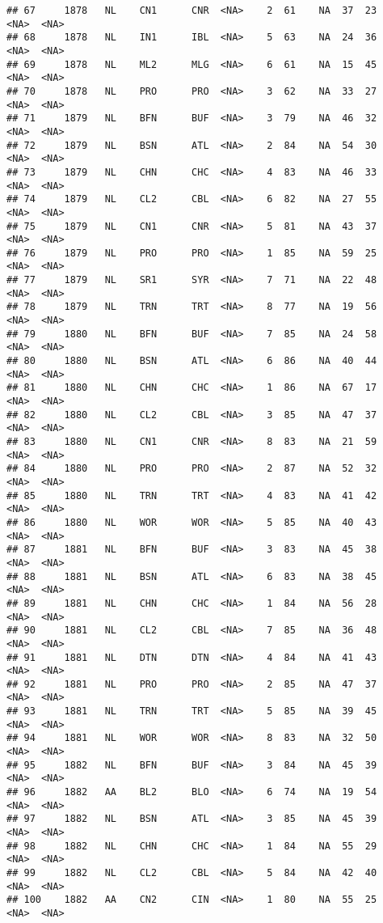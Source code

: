 \documentclass[]{article}
\begin{document}
\begin{verbatim}
## 67     1878   NL    CN1      CNR  <NA>    2  61    NA  37  23   <NA>  <NA>
## 68     1878   NL    IN1      IBL  <NA>    5  63    NA  24  36   <NA>  <NA>
## 69     1878   NL    ML2      MLG  <NA>    6  61    NA  15  45   <NA>  <NA>
## 70     1878   NL    PRO      PRO  <NA>    3  62    NA  33  27   <NA>  <NA>
## 71     1879   NL    BFN      BUF  <NA>    3  79    NA  46  32   <NA>  <NA>
## 72     1879   NL    BSN      ATL  <NA>    2  84    NA  54  30   <NA>  <NA>
## 73     1879   NL    CHN      CHC  <NA>    4  83    NA  46  33   <NA>  <NA>
## 74     1879   NL    CL2      CBL  <NA>    6  82    NA  27  55   <NA>  <NA>
## 75     1879   NL    CN1      CNR  <NA>    5  81    NA  43  37   <NA>  <NA>
## 76     1879   NL    PRO      PRO  <NA>    1  85    NA  59  25   <NA>  <NA>
## 77     1879   NL    SR1      SYR  <NA>    7  71    NA  22  48   <NA>  <NA>
## 78     1879   NL    TRN      TRT  <NA>    8  77    NA  19  56   <NA>  <NA>
## 79     1880   NL    BFN      BUF  <NA>    7  85    NA  24  58   <NA>  <NA>
## 80     1880   NL    BSN      ATL  <NA>    6  86    NA  40  44   <NA>  <NA>
## 81     1880   NL    CHN      CHC  <NA>    1  86    NA  67  17   <NA>  <NA>
## 82     1880   NL    CL2      CBL  <NA>    3  85    NA  47  37   <NA>  <NA>
## 83     1880   NL    CN1      CNR  <NA>    8  83    NA  21  59   <NA>  <NA>
## 84     1880   NL    PRO      PRO  <NA>    2  87    NA  52  32   <NA>  <NA>
## 85     1880   NL    TRN      TRT  <NA>    4  83    NA  41  42   <NA>  <NA>
## 86     1880   NL    WOR      WOR  <NA>    5  85    NA  40  43   <NA>  <NA>
## 87     1881   NL    BFN      BUF  <NA>    3  83    NA  45  38   <NA>  <NA>
## 88     1881   NL    BSN      ATL  <NA>    6  83    NA  38  45   <NA>  <NA>
## 89     1881   NL    CHN      CHC  <NA>    1  84    NA  56  28   <NA>  <NA>
## 90     1881   NL    CL2      CBL  <NA>    7  85    NA  36  48   <NA>  <NA>
## 91     1881   NL    DTN      DTN  <NA>    4  84    NA  41  43   <NA>  <NA>
## 92     1881   NL    PRO      PRO  <NA>    2  85    NA  47  37   <NA>  <NA>
## 93     1881   NL    TRN      TRT  <NA>    5  85    NA  39  45   <NA>  <NA>
## 94     1881   NL    WOR      WOR  <NA>    8  83    NA  32  50   <NA>  <NA>
## 95     1882   NL    BFN      BUF  <NA>    3  84    NA  45  39   <NA>  <NA>
## 96     1882   AA    BL2      BLO  <NA>    6  74    NA  19  54   <NA>  <NA>
## 97     1882   NL    BSN      ATL  <NA>    3  85    NA  45  39   <NA>  <NA>
## 98     1882   NL    CHN      CHC  <NA>    1  84    NA  55  29   <NA>  <NA>
## 99     1882   NL    CL2      CBL  <NA>    5  84    NA  42  40   <NA>  <NA>
## 100    1882   AA    CN2      CIN  <NA>    1  80    NA  55  25   <NA>  <NA>

\end{verbatim}
\end{document}
